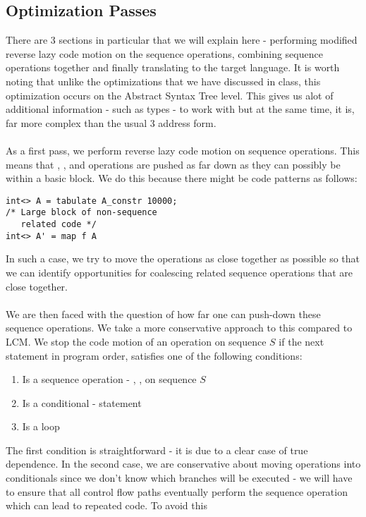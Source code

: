 \documentclass[a4paper,twocolumn]{article}
\begin{document}
\subsection{Optimization Passes}

There are 3 sections in particular that we will explain here - performing
modified reverse lazy code motion on the sequence operations, combining sequence
operations together and finally translating to the target language. It is worth
noting that unlike the optimizations that we have discussed in class, this
optimization occurs on the Abstract Syntax Tree level. This gives us alot of
additional information - such as types - to work with but at the same time, it
is, far more complex than the usual 3 address form.
\\
\\
As a first pass, we perform reverse lazy code motion on sequence
operations. This means that , ,  and
 operations are pushed as far down as they can possibly be within
a basic block. We do this because there might be code patterns as follows:
\begin{verbatim}
int<> A = tabulate A_constr 10000;
/* Large block of non-sequence
   related code */
int<> A' = map f A
\end{verbatim}
In such a case, we try to move the operations as close together as possible so
that we can identify opportunities for coalescing related sequence operations
that are close together.
\\
\\We are then faced with the question of how far one can push-down these
sequence operations. We take a more conservative approach to this compared to
LCM. We stop the code motion of an operation on sequence $S$ if the next
statement in program order, satisfies one of the following conditions:
\begin{enumerate}
\item Is a sequence operation - , , 
on sequence $S$
\item Is a conditional -  statement
\item Is a loop
\end{enumerate}
The first condition is straightforward - it is due to a clear case of true
dependence. In the second case, we are conservative about moving
operations into conditionals since we don't know which branches will
be executed - we will have to ensure that all control flow paths eventually
perform the sequence operation which can lead to repeated code. To avoid this
\end{document}

